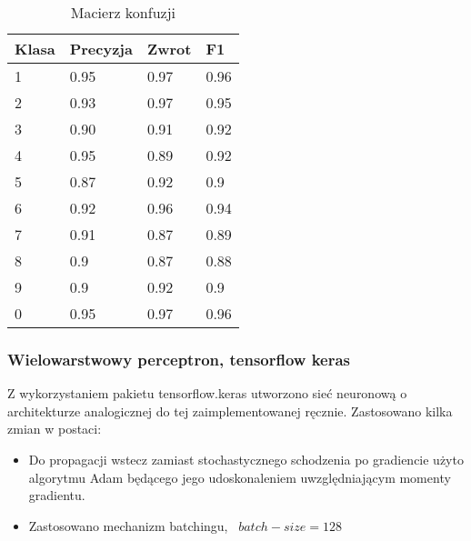 \documentclass{article}
\begin{document}
\begin{table}[H]
    \centering
    \begin{tabular}{|l|l|l|l|}
    \hline
    Klasa & Precyzja & Zwrot & F1   \\
    \hline
    1     & 0.95     & 0.97  & 0.96 \\
    2     & 0.93     & 0.97  & 0.95 \\
    3     & 0.90     & 0.91  & 0.92 \\
    4     & 0.95     & 0.89  & 0.92 \\
    5     & 0.87     & 0.92  & 0.9  \\
    6     & 0.92     & 0.96  & 0.94 \\
    7     & 0.91     & 0.87  & 0.89 \\
    8     & 0.9      & 0.87  & 0.88 \\
    9     & 0.9      & 0.92  & 0.9  \\
    0     & 0.95     & 0.97  & 0.96 \\
    \hline
    \end{tabular}
    \caption{Macierz konfuzji}
\end{table}
    

\subsubsection{Wielowarstwowy perceptron, tensorflow keras}

Z wykorzystaniem pakietu tensorflow.keras utworzono sieć neuronową o architekturze 
analogicznej do tej zaimplementowanej ręcznie. Zastosowano kilka zmian w postaci:

\begin{itemize}
\item Do propagacji wstecz zamiast stochastycznego schodzenia po gradiencie użyto algorytmu 
Adam będącego jego udoskonaleniem uwzględniającym momenty gradientu.
\item Zastosowano mechanizm batchingu, ~$batch-size = 128$
\end{itemize}
\end{document}
